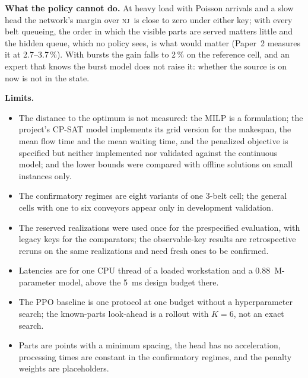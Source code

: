 \documentclass[11pt,a4paper]{article}
\theoremstyle{plain}
\theoremstyle{definition}
\theoremstyle{remark}
\newcommand{\nj}{\textsc{nj}}
\begin{document}
\textbf{What the policy cannot do.} At heavy load with Poisson arrivals and a slow head the
network's margin over \nj\ is close to zero under either key; with every belt queueing, the
order in which the visible parts are served matters little and the hidden queue, which no
policy sees, is what would matter (Paper~2 measures it at 2.7--3.7\,\%). With bursts the gain
falls to 2\,\% on the reference cell, and an expert that knows the burst model does not raise
it: whether the source is on now is not in the state.

\textbf{Limits.}\label{sec:limits}
\begin{itemize}[nosep]
\item The distance to the optimum is not measured: the MILP is a formulation; the
  project's CP-SAT model implements its grid version for the makespan, the mean flow time
  and the mean waiting time, and the penalized objective is specified but neither
  implemented nor validated against the continuous model; and the lower bounds were compared with offline solutions on small instances
  only.
\item The confirmatory regimes are eight variants of one 3-belt cell; the general cells with
  one to six conveyors appear only in development validation.
\item The reserved realizations were used once for the prespecified evaluation, with legacy
  keys for the comparators; the observable-key results are retrospective reruns on the same
  realizations and need fresh ones to be confirmed.
\item Latencies are for one CPU thread of a loaded workstation and a 0.88~M-parameter model,
  above the 5~ms design budget there.
\item The PPO baseline is one protocol at one budget without a hyperparameter search; the
  known-parts look-ahead is a rollout with $K=6$, not an exact search.
\item Parts are points with a minimum spacing, the head has no acceleration, processing
  times are constant in the confirmatory regimes, and the penalty weights are placeholders.
\end{itemize}

\end{document}

